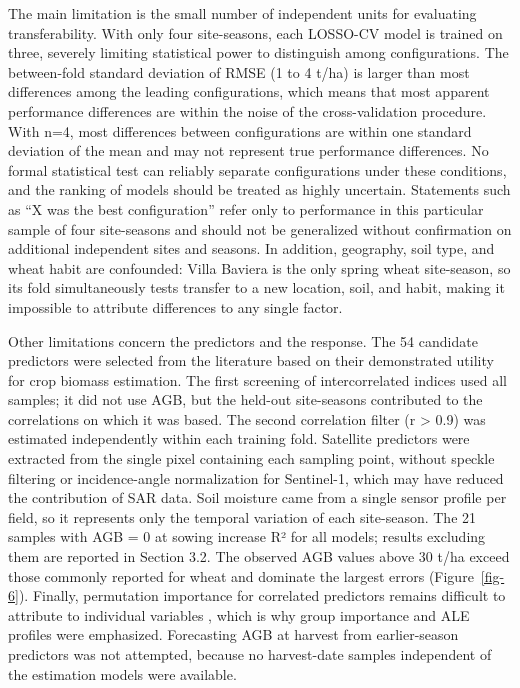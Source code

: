 \documentclass[
  english,
  review,
  number,
  sort,compress,
  authoryear,
  3p]{elsarticle}
\begin{document}
The main limitation is the small number of independent units for
evaluating transferability. With only four site-seasons, each LOSSO-CV
model is trained on three, severely limiting statistical power to
distinguish among configurations. The between-fold standard deviation of
RMSE (1 to 4 t/ha) is larger than most differences among the leading
configurations, which means that most apparent performance differences
are within the noise of the cross-validation procedure. With n=4, most
differences between configurations are within one standard deviation of
the mean and may not represent true performance differences. No formal
statistical test can reliably separate configurations under these
conditions, and the ranking of models should be treated as highly
uncertain. Statements such as ``X was the best configuration'' refer
only to performance in this particular sample of four site-seasons and
should not be generalized without confirmation on additional independent
sites and seasons. In addition, geography, soil type, and wheat habit
are confounded: Villa Baviera is the only spring wheat site-season, so
its fold simultaneously tests transfer to a new location, soil, and
habit, making it impossible to attribute differences to any single
factor.

Other limitations concern the predictors and the response. The 54
candidate predictors were selected from the literature based on their
demonstrated utility for crop biomass estimation. The first screening of
intercorrelated indices used all samples; it did not use AGB, but the
held-out site-seasons contributed to the correlations on which it was
based. The second correlation filter (r \textgreater{} 0.9) was
estimated independently within each training fold. Satellite predictors
were extracted from the single pixel containing each sampling point,
without speckle filtering or incidence-angle normalization for
Sentinel-1, which may have reduced the contribution of SAR data. Soil
moisture came from a single sensor profile per field, so it represents
only the temporal variation of each site-season. The 21 samples with AGB
= 0 at sowing increase R² for all models; results excluding them are
reported in Section 3.2. The observed AGB values above 30 t/ha exceed
those commonly reported for wheat and dominate the largest errors
(Figure~\ref{fig-6}). Finally, permutation importance for correlated
predictors remains difficult to attribute to individual variables
\citep{Strobl2008}, which is why group importance and ALE profiles were
emphasized. Forecasting AGB at harvest from earlier-season predictors
was not attempted, because no harvest-date samples independent of the
estimation models were available.
\end{document}
